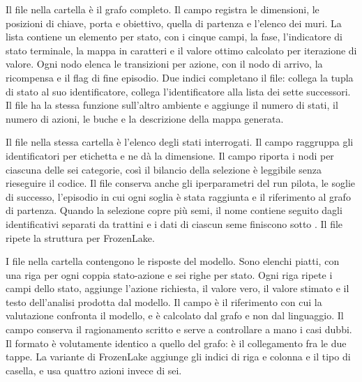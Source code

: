 \documentclass[12pt,a4paper]{article}
\begin{document}
Il file  nella cartella  \`e il grafo completo. Il campo  registra le dimensioni, le posizioni di chiave, porta e obiettivo, quella di partenza e l'elenco dei muri. La lista  contiene un elemento per stato, con i cinque campi, la fase, l'indicatore di stato terminale, la mappa in caratteri e il valore ottimo  calcolato per iterazione di valore. Ogni nodo elenca le transizioni per azione, con il nodo di arrivo, la ricompensa e il flag di fine episodio. Due indici completano il file:  collega la tupla di stato al suo identificatore,  collega l'identificatore alla lista dei sette successori. Il file  ha la stessa funzione sull'altro ambiente e aggiunge il numero di stati, il numero di azioni, le buche e la descrizione della mappa generata.

Il file  nella stessa cartella \`e l'elenco degli stati interrogati. Il campo  raggruppa gli identificatori per etichetta e  ne d\`a la dimensione. Il campo  riporta i nodi per ciascuna delle sei categorie, cos\`i il bilancio della selezione \`e leggibile senza rieseguire il codice. Il file conserva anche gli iperparametri del run pilota, le soglie di successo, l'episodio in cui ogni soglia \`e stata raggiunta e il riferimento al grafo di partenza. Quando la selezione copre pi\`u semi, il nome contiene  seguito dagli identificativi separati da trattini e i dati di ciascun seme finiscono sotto . Il file  ripete la struttura per FrozenLake.

I file nella cartella  contengono le risposte del modello. Sono elenchi piatti, con una riga per ogni coppia stato-azione e sei righe per stato. Ogni riga ripete i campi dello stato, aggiunge l'azione richiesta, il valore vero, il valore stimato e il testo dell'analisi prodotta dal modello. Il campo  \`e il riferimento con cui la valutazione confronta il modello, e \`e calcolato dal grafo e non dal linguaggio. Il campo  conserva il ragionamento scritto e serve a controllare a mano i casi dubbi. Il formato \`e volutamente identico a quello del grafo: \`e il collegamento fra le due tappe. La variante di FrozenLake aggiunge gli indici di riga e colonna e il tipo di casella, e usa quattro azioni invece di sei.
\end{document}
